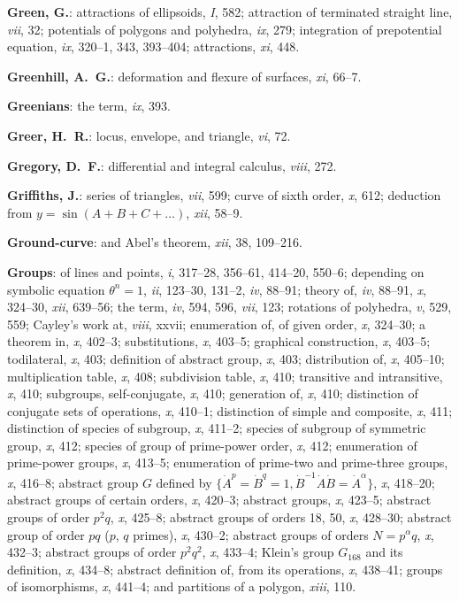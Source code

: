 \documentclass[11pt,a4paper]{article}
\newcommand{\IndexEntry}[1]{\textbf{#1}}
\newcommand{\V}[1]{\textit{#1}} %
\begin{document}
\IndexEntry{Green, G.}: attractions of ellipsoids, \V{I}, 582; attraction of terminated straight line, \V{vii}, 32; potentials of polygons and polyhedra, \V{ix}, 279; integration of prepotential equation, \V{ix}, 320--1, 343, 393--404; attractions, \V{xi}, 448.

\IndexEntry{Greenhill, A.\ G.}: deformation and flexure of surfaces, \V{xi}, 66--7.

\IndexEntry{Greenians}: the term, \V{ix}, 393.

\IndexEntry{Greer, H.\ R.}: locus, envelope, and triangle, \V{vi}, 72.

\IndexEntry{Gregory, D.\ F.}: differential and integral calculus, \V{viii}, 272.

\IndexEntry{Griffiths, J.}: series of triangles, \V{vii}, 599; curve of sixth order, \V{x}, 612; deduction from $y = \sin(A + B + C + \ldots)$, \V{xii}, 58--9.

\IndexEntry{Ground-curve}: and Abel's theorem, \V{xii}, 38, 109--216.

\IndexEntry{Groups}: of lines and points, \V{i}, 317--28, 356--61, 414--20, 550--6; depending on symbolic equation $\theta^n = 1$, \V{ii}, 123--30, 131--2, \V{iv}, 88--91; theory of, \V{iv}, 88--91, \V{x}, 324--30, \V{xii}, 639--56; the term, \V{iv}, 594, 596, \V{vii}, 123; rotations of polyhedra, \V{v}, 529, 559; Cayley's work at, \V{viii}, xxvii; enumeration of, of given order, \V{x}, 324--30; a theorem in, \V{x}, 402--3; substitutions, \V{x}, 403--5; graphical construction, \V{x}, 403--5; todilateral, \V{x}, 403; definition of abstract group, \V{x}, 403; distribution of, \V{x}, 405--10; multiplication table, \V{x}, 408; subdivision table, \V{x}, 410; transitive and intransitive, \V{x}, 410; subgroups, self-conjugate, \V{x}, 410; generation of, \V{x}, 410; distinction of conjugate sets of operations, \V{x}, 410--1; distinction of simple and composite, \V{x}, 411; distinction of species of subgroup, \V{x}, 411--2; species of subgroup of symmetric group, \V{x}, 412; species of group of prime-power order, \V{x}, 412; enumeration of prime-power groups, \V{x}, 413--5; enumeration of prime-two and prime-three groups, \V{x}, 416--8; abstract group $G$ defined by $\{\dot{A}^p = \dot{B}^q = 1, \dot{B}^{-1}\dot{A}\dot{B} = \dot{A}^\alpha\}$, \V{x}, 418--20; abstract groups of certain orders, \V{x}, 420--3; abstract groups, \V{x}, 423--5; abstract groups of order $p^2q$, \V{x}, 425--8; abstract groups of orders 18, 50, \V{x}, 428--30; abstract group of order $pq$ ($p$, $q$ primes), \V{x}, 430--2; abstract groups of orders $N = p^\alpha q$, \V{x}, 432--3; abstract groups of order $p^2q^2$, \V{x}, 433--4; Klein's group $G_{168}$ and its definition, \V{x}, 434--8; abstract definition of, from its operations, \V{x}, 438--41; groups of isomorphisms, \V{x}, 441--4; and partitions of a polygon, \V{xiii}, 110.
\end{document}
